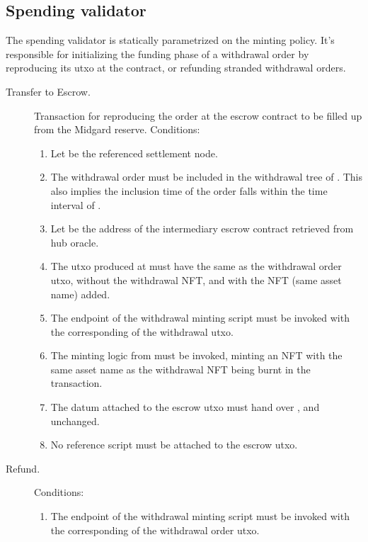 \documentclass[../midgard.tex]{subfiles}
\begin{document}
\subsection{Spending validator}
\label{h:withdrawal-order-spending-validator}

The  spending validator is statically parametrized on the  minting policy.
It's responsible for initializing the funding phase of a withdrawal order by reproducing its utxo at the  contract, or refunding stranded withdrawal orders.

\begin{description}
  \item[Transfer to Escrow.] Transaction for reproducing the order at the escrow contract to be filled up from the Midgard reserve.
    Conditions:
    \begin{enumerate}
      \item Let  be the referenced settlement node.
      \item The withdrawal order must be included in the withdrawal tree of .
        This also implies the inclusion time of the order falls within the time interval of .
      \item Let  be the address of the intermediary escrow contract retrieved from hub oracle.
      \item The utxo produced at  must have the same  as the withdrawal order utxo, without the withdrawal NFT, and with the  NFT (same asset name) added.
      \item The  endpoint of the withdrawal minting script must be invoked with the corresponding  of the withdrawal utxo.
      \item The minting logic from  must be invoked, minting an NFT with the same asset name as the withdrawal NFT being burnt in the transaction.
      \item The datum attached to the escrow utxo must hand over ,  and  unchanged.
      \item No reference script must be attached to the escrow utxo.
    \end{enumerate}
  \item[Refund.] 
    Conditions:
    \begin{enumerate}
      \item The  endpoint of the withdrawal minting script must be invoked with the corresponding  of the withdrawal order utxo.

\end{enumerate}
\end{description}
\end{document}
